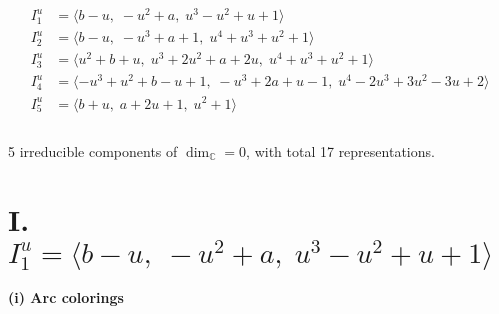 \documentclass[1p]{elsarticle_modified}
\theoremstyle{definition}
\begin{document}
\begin{align*}
I^u_{1}&=\langle 
b- u,\;- u^2+a,\;u^3- u^2+u+1\rangle \\
I^u_{2}&=\langle 
b- u,\;- u^3+a+1,\;u^4+u^3+u^2+1\rangle \\
I^u_{3}&=\langle 
u^2+b+u,\;u^3+2 u^2+a+2 u,\;u^4+u^3+u^2+1\rangle \\
I^u_{4}&=\langle 
- u^3+u^2+b- u+1,\;- u^3+2 a+u-1,\;u^4-2 u^3+3 u^2-3 u+2\rangle \\
I^u_{5}&=\langle 
b+u,\;a+2 u+1,\;u^2+1\rangle \\
\\
\end{align*}
\raggedright * 5 irreducible components of $\dim_{\mathbb{C}}=0$, with total 17 representations.\\
\newpage
\renewcommand{\arraystretch}{1}
\centering \section*{I. $I^u_{1}= \langle b- u,\;- u^2+a,\;u^3- u^2+u+1 \rangle$}
\flushleft \textbf{(i) Arc colorings}\\
\end{document}
